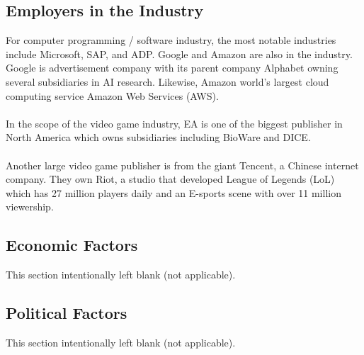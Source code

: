 \documentclass[10pt,letterpaper]{article}
\begin{document}
\subsection{Employers in the Industry}

For computer programming / software industry, the most notable industries include Microsoft, SAP, and ADP. Google and Amazon are also in the industry. Google is advertisement company with its parent company Alphabet owning several subsidiaries in AI research. Likewise, Amazon world's largest cloud computing service Amazon Web Services (AWS).\\
\\
In the scope of the video game industry, EA is one of the biggest publisher in North America which owns subsidiaries including BioWare and DICE.\\
\\
Another large video game publisher is from the giant Tencent, a Chinese internet company. They own Riot, a studio that developed League of Legends (LoL) which has 27 million players daily and an E-sports scene with over 11 million viewership.\cite{lol-wiki}\\

\subsection{Economic Factors}


\begin{center}
	This section intentionally left blank (not applicable).
\end{center}



\subsection{Political Factors}

\begin{center}
	This section intentionally left blank (not applicable).
\end{center}


\clearpage
\end{document}
